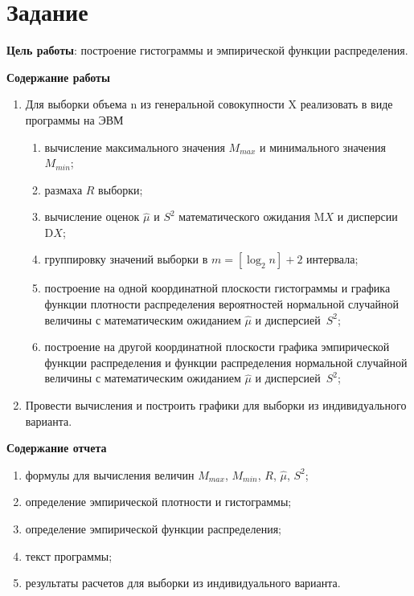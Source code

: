 \chapter{Задание}

\textbf{Цель работы}: построение гистограммы и эмпирической функции
распределения.

\textbf{Содержание работы}

\begin{enumerate}
    \item Для выборки объема n из генеральной совокупности X реализовать в виде
        программы на ЭВМ
        \begin{enumerate}[label=\asbuk*)]
            \item вычисление максимального значения $M_{max}$ и минимального
                значения $M_{min}$;
            \item размаха $R$ выборки;
            \item вычисление оценок $\hat{\mu}$ и $S^2$ математического ожидания
                $\mathrm{M}X$ и дисперсии $\mathrm{D}X$;
            \item группировку значений выборки в $m = [\log_2 n] + 2$ интервала;
            \item построение на одной координатной плоскости гистограммы и
                графика функции плотности распределения вероятностей нормальной
                случайной величины с математическим ожиданием $\hat{\mu}$ и
                дисперсией~$S^2$;
            \item построение на другой координатной плоскости графика
                эмпирической функции распределения и функции распределения
                нормальной случайной величины с математическим ожиданием
                $\hat{\mu}$ и дисперсией~$S^2$;
        \end{enumerate}
    \item Провести вычисления и построить графики для выборки из индивидуального
        варианта.
\end{enumerate}

\textbf{Содержание отчета}

\begin{enumerate}
    \item формулы для вычисления величин $M_{max}$, $M_{min}$, $R$, $\hat{\mu}$, $S^2$;
    \item определение эмпирической плотности и гистограммы;
    \item определение эмпирической функции распределения;
    \item текст программы;
    \item результаты расчетов для выборки из индивидуального варианта.
\end{enumerate}
